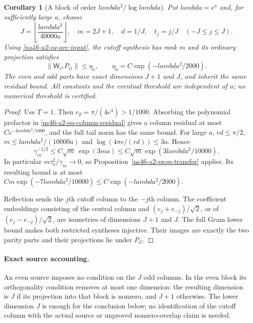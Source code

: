\documentclass[11pt]{article}
\def\lambda{lambda}%
\newtheorem{corollary}[theorem]{Corollary}
\theoremstyle{remark}
\begin{document}
\begin{corollary}[A block of order $\lambda^2/\log\lambda$]
\label{ns46-a2-cor-large-block}
Put $\lambda=e^a$ and, for sufficiently large $a$, choose
\[
 J=\left\lfloor\frac{\lambda^2}{40000a}\right\rfloor,
 \quad m=2J+1,\quad d=1/J,\quad t_j=j/J\quad(-J\le j\le J).
\]
Using \eqref{ns46-a2-eq-arc-input}, the cutoff synthesis has
rank $m$ and its ordinary projection satisfies
\begin{equation}\label{ns46-a2-eq-large-residual}
 \|\mathsf W_{e^a}P_G\|\le\eta_a,
 \qquad \eta_a=C\exp(-\lambda^2/2000).
\end{equation}
The even and odd parts have exact dimensions $J+1$ and $J$,
and inherit the same residual bound. All constants and the eventual
threshold are independent of $a$; no numerical threshold is certified.
\end{corollary}
\begin{proof}
Use $T=1$. Then $c_T=\pi/(4e^4)>1/1000$.
Absorbing the polynomial prefactor in
\eqref{ns46-a2-eq-column-residual} gives a column residual at most
$Ce^{-\lambda^2/1000}$, and the full tail norm has the same bound.
For large $a$, $rd\le\pi/2$, $m\le\lambda^2/(10000a)$ and
$\log(4\pi e/(rd))\le3a$. Hence
\[
 \gamma_m^{-1/2}\le C\sqrt m\,
       \exp(3ma)\le C\sqrt m\exp(3\lambda^2/10000).
\]
In particular $m\tau_a^2/\gamma_m\to0$, so
Proposition~\ref{ns46-a2-prop-transfer} applies. Its resulting
bound is at most
$Cm\exp(-7\lambda^2/10000)\le C\exp(-\lambda^2/2000)$.

Reflection sends the $j$th cutoff column to the $-j$th column.
The coefficient embeddings consisting of the central column and
$(e_j+e_{-j})/\sqrt2$, or of $(e_j-e_{-j})/\sqrt2$, are
isometries of dimensions $J+1$ and $J$. The full Gram lower bound
makes both restricted syntheses injective. Their images are exactly
the two parity parts and their projections lie under $P_G$.
\end{proof}

\paragraph{Exact source accounting.}
An even source imposes no condition on the $J$ odd columns. In the
even block its orthogonality condition removes at most one dimension:
the resulting dimension is $J$ if its projection into that block is
nonzero, and $J+1$ otherwise. The lower dimension $J$ is enough for
the conclusion below; no identification of the cutoff column with
the actual source or unproved nonzero-overlap claim is needed.
\end{document}
